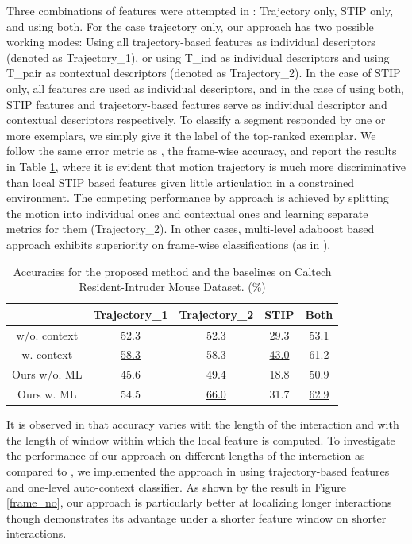 Three combinations of features were attempted in \cite{CRIM13}: Trajectory only, STIP only, and using both. For the case trajectory only, our approach has two possible working modes: Using all trajectory-based features as individual descriptors (denoted as Trajectory\_1), or using T\_ind as individual descriptors and using T\_pair as contextual descriptors (denoted as Trajectory\_2). In the case of STIP only, all features are used as individual descriptors, and in the case of using both, STIP features and trajectory-based features serve as individual descriptor and contextual descriptors respectively. To classify a segment responded by one or more exemplars, we simply give it the label of the top-ranked exemplar. We follow the same error metric as \cite{CRIM13}, the frame-wise accuracy, and report the results in Table \ref{CRIMAccu}, where it is evident that motion trajectory is much more discriminative than local STIP based features given little articulation in a constrained environment. The competing performance by approach is achieved by splitting the motion into individual ones and contextual ones and learning separate metrics for them (Trajectory\_2). In other cases, multi-level adaboost based approach exhibits superiority on frame-wise classifications (as in \cite{CRIM13}).


\begin{table}[ht]
\centering \caption{Accuracies for the proposed method and the baselines on Caltech Resident-Intruder Mouse Dataset. (\%)}
\footnotesize{
\begin{tabular}{|c||c|c|c|c|}
\hline   & Trajectory\_1  & Trajectory\_2 & STIP & Both \\
\hline \cite{CRIM13} w/o. context & 52.3  & 52.3 & 29.3 & 53.1\\
\hline \cite{CRIM13} w. context &  \underline{58.3} & 58.3 & \underline{43.0} & 61.2\\
\hline Ours w/o. ML &  45.6 & 49.4 & 18.8 & 50.9 \\
\hline Ours w. ML & 54.5 & \underline{66.0} & 31.7 & \underline{62.9}\\
\hline 
\end{tabular}
}
\label{CRIMAccu}
\end{table}

It is observed in \cite{CRIM13} that accuracy varies with the length of the interaction and with the length of window within which the local feature is computed. To investigate the performance of our approach on different lengths of the interaction as compared to \cite{CRIM13}, we implemented the approach in \cite{CRIM13} using trajectory-based features and one-level auto-context classifier. As shown by the result in Figure \ref{frame_no}, our approach is particularly better at localizing longer interactions though \cite{CRIM13} demonstrates its advantage under a shorter feature window on shorter interactions. 

